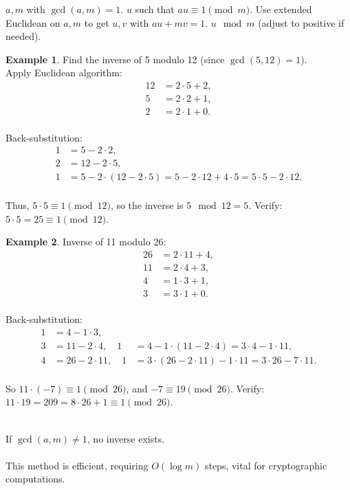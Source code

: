 \documentclass[12pt,openany]{book}
\theoremstyle{definition}
\newtheorem{example}{Example}[chapter]
\theoremstyle{plain}
\theoremstyle{remark}
\begin{document}
\begin{algorithm}[H]
\caption{Modular Inverse via Extended Euclidean}
\begin{algorithmic}[1]
\Require $a, m$ with $\gcd(a, m) = 1$.
\Ensure $u$ such that $a u \equiv 1 \pmod{m}$.
\State Use extended Euclidean on $a, m$ to get $u, v$ with $a u + m v = 1$.
\Return $u \mod m$ (adjust to positive if needed).
\end{algorithmic}
\end{algorithm}

\begin{example}
  Find the inverse of 5 modulo 12 (since $\gcd(5, 12) = 1$).
  \noindent
  \\
  Apply Euclidean algorithm:
  \begin{align*}
    12 &= 2 \cdot 5 + 2, \\
    5 &= 2 \cdot 2 + 1, \\
    2 &= 2 \cdot 1 + 0.
  \end{align*}
  \noindent
  \\
  Back-substitution:
  \begin{align*}
    1 &= 5 - 2 \cdot 2, \\
    2 &= 12 - 2 \cdot 5, \\
    1 &= 5 - 2 \cdot (12 - 2 \cdot 5) = 5 - 2 \cdot 12 + 4 \cdot 5 = 5 \cdot 5 - 2 \cdot 12.
  \end{align*}
  \noindent
  \\
  Thus, $5 \cdot 5 \equiv 1 \pmod{12}$, so the inverse is $5 \mod 12 = 5$. Verify: $5 \cdot 5 = 25 \equiv 1 \pmod{12}$.
\end{example}

\begin{example}
  Inverse of 11 modulo 26:
  \begin{align*}
    26 &= 2 \cdot 11 + 4, \\
    11 &= 2 \cdot 4 + 3, \\
    4 &= 1 \cdot 3 + 1, \\
    3 &= 3 \cdot 1 + 0.
  \end{align*}
  \noindent
  \\
  Back-substitution:
  \begin{align*}
    1 &= 4 - 1 \cdot 3, \\
    3 &= 11 - 2 \cdot 4, \quad 1 &= 4 - 1 \cdot (11 - 2 \cdot 4) = 3 \cdot 4 - 1 \cdot 11, \\
    4 &= 26 - 2 \cdot 11, \quad 1 &= 3 \cdot (26 - 2 \cdot 11) - 1 \cdot 11 = 3 \cdot 26 - 7 \cdot 11.
  \end{align*}
  \noindent
  \\
  So $11 \cdot (-7) \equiv 1 \pmod{26}$, and $-7 \equiv 19 \pmod{26}$. Verify: $11 \cdot 19 = 209 = 8 \cdot 26 + 1 \equiv 1 \pmod{26}$.
\end{example}
\noindent
\\
If $\gcd(a, m) \neq 1$, no inverse exists.
\noindent
\\ \\
This method is efficient, requiring $O(\log m)$ steps, vital for cryptographic computations.
\end{document}
